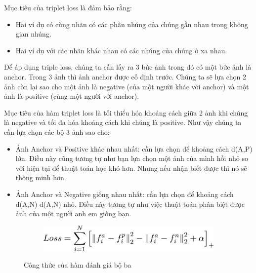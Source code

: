 Mục tiêu của triplet loss là đảm bảo rằng:
\begin{itemize}
    \item Hai ví dụ có cùng nhãn có các phần nhúng của chúng gần nhau trong không gian nhúng.
    \item Hai ví dụ với các nhãn khác nhau có các nhúng của chúng ở xa nhau.
\end{itemize}

Để áp dụng triple loss, chúng ta cần lấy ra 3 bức ảnh trong đó có một bức ảnh là anchor.
Trong 3 ảnh thì ảnh anchor được cố định trước.
Chúng ta sẽ lựa chọn 2 ảnh còn lại sao cho một ảnh là negative
(của một người khác với anchor) và một ảnh là positive (cùng một người với anchor).


Mục tiêu của hàm triplet loss là tối thiểu hóa khoảng cách giữa 2 ảnh khi chúng là
negative và tối đa hóa khoảng cách khi chúng là positive.
Như vậy chúng ta cần lựa chọn các bộ 3 ảnh sao cho:
\begin{itemize}
    \item Ảnh Anchor và Positive khác nhau nhất: cần lựa chọn để khoảng cách d(A,P) lớn.
          Điều này cũng tương tự như bạn lựa chọn một ảnh của mình hồi nhỏ so với hiện tại để
          thuật toán học khó hơn. Nhưng nếu nhận biết được thì nó sẽ thông minh hơn.
    \item Ảnh Anchor và Negative giống nhau nhất: cần lựa chọn để khoảng cách d(A,N)
          d(A,N) nhỏ. Điều này tương tự như việc thuật toán phân biệt được ảnh của một người
          anh em giống bạn.
\end{itemize}

\begin{figure}
    \begin{subfigure}{0.8\textwidth}
        \begin{center}
            \includegraphics[width=1.\linewidth]{Chapters/items/fomura.png}
        \end{center}
        \label{fig: fomura}
    \end{subfigure}
    \caption{Công thức của hàm đánh giá bộ ba}
\end{figure}


